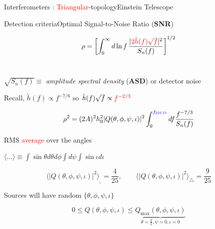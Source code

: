 \documentclass[xcolor=dvipsnames,t]{beamer}
\newcommand{\red}[1]{\textcolor{red}{#1}}
\newcommand{\bl}[1]{\textcolor{blue}{#1}}
\newcommand{\f}{\frac}
\begin{document}
\begin{frame}{Interferometers : \red{Triangular}-topology}{Einstein Telescope}
{
  }

   
\end{frame}


\begin{frame}{Detection criteria}{Optimal Signal-to-Noise Ratio ({\bf SNR})}
  \vspace{-5mm}
  \begin{footnotesize} 
  \[
  \rho=\left[ \int_0^\infty d\ln f\, \f{|\red{2\tilde{h}(f)\sqrt{f}}|^2}{S_n(f)}\right]^{1/2} 
  \]
  \\
  \end{footnotesize}
  $\sqrt{S_n(f)}\equiv$ {\it amplitude spectral density} ({\bf ASD}) or  detector noise
  \\
  {
    \vspace{3mm}
    Recall, $\tilde{h}(f) \propto f^{-7/6}$ so $\tilde{h}(f) \sqrt{f} \propto \red{f^{-2/3}}$
    \begin{footnotesize} 
    \[
    \rho^2 =  (2A)^2 h_0^2 |Q(\theta,\phi,\psi,\iota)|^2 \int_0^{\bl{f_\text{ISCO}}} df \f{f^{-7/3}}{S_n(f)} 
    \]
    \end{footnotesize}
  }
  RMS \red{average} over the angles 
  \begin{small}
  $ \langle \ldots \rangle \equiv \int \sin\theta d\theta d\phi \int d\psi \int\sin\iota d\iota $
  \end{small}
  \begin{footnotesize} 
  \[
  \langle |Q(\theta,\phi,\psi,\iota)|^2 \rangle_\llcorner = \f{4}{25}, \qquad \langle |Q(\theta,\phi,\psi,\iota)|^2 \rangle_\triangle = \f{9}{25}
  \]
  \end{footnotesize}
  Sources will have random $\{\theta,\phi,\psi,\iota\}$ \\
  \begin{footnotesize} 
  \[
  0 \le Q(\theta,\phi,\psi,\iota) \le \underbrace{Q_\text{max}(\theta,\phi,\psi,\iota)}_{\theta=\tfrac{\pi}{2},\psi=0,\iota=0}
  \]
  \end{footnotesize}
\end{frame}
\end{document}
